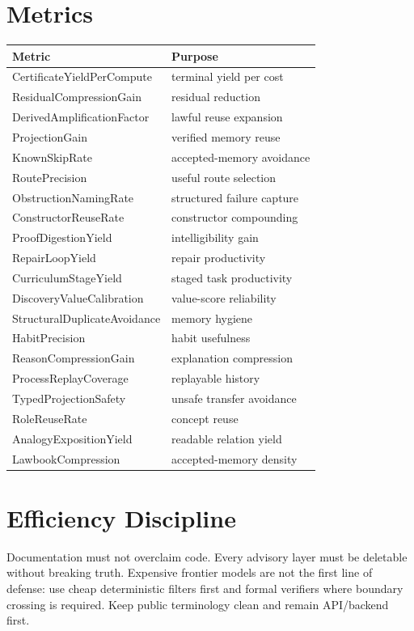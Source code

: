 \documentclass[11pt,a4paper]{article}
\begin{document}
\section{Metrics}
\begin{longtable}{ll}
\toprule
Metric & Purpose\\
\midrule
CertificateYieldPerCompute & terminal yield per cost\\
ResidualCompressionGain & residual reduction\\
DerivedAmplificationFactor & lawful reuse expansion\\
ProjectionGain & verified memory reuse\\
KnownSkipRate & accepted-memory avoidance\\
RoutePrecision & useful route selection\\
ObstructionNamingRate & structured failure capture\\
ConstructorReuseRate & constructor compounding\\
ProofDigestionYield & intelligibility gain\\
RepairLoopYield & repair productivity\\
CurriculumStageYield & staged task productivity\\
DiscoveryValueCalibration & value-score reliability\\
StructuralDuplicateAvoidance & memory hygiene\\
HabitPrecision & habit usefulness\\
ReasonCompressionGain & explanation compression\\
ProcessReplayCoverage & replayable history\\
TypedProjectionSafety & unsafe transfer avoidance\\
RoleReuseRate & concept reuse\\
AnalogyExpositionYield & readable relation yield\\
LawbookCompression & accepted-memory density\\
\bottomrule
\end{longtable}

\section{Efficiency Discipline}
Documentation must not overclaim code. Every advisory layer must be deletable without breaking truth. Expensive frontier models are not the first line of defense: use cheap deterministic filters first and formal verifiers where boundary crossing is required. Keep public terminology clean and remain API/backend first.
\end{document}
